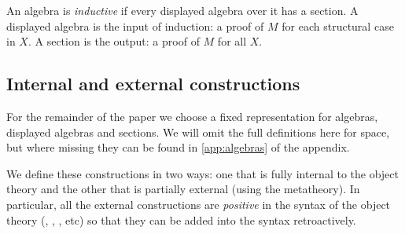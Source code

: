 \begin{definition}
An algebra is \emph{inductive} if every displayed algebra over it has a section.
A displayed algebra is the input of induction: a proof of $M$ for each structural case in $X$.
A section is the output: a proof of $M$ for all $X$.
\end{definition}

\subsection{Internal and external constructions}

For the remainder of the paper we choose a fixed representation for algebras,
displayed algebras and sections. We will omit the full definitions here for
space, but where missing they can be found in \cref{app:algebras} of the appendix.

We define these constructions in two ways: one that is fully internal to the
object theory and the other that is partially external (using the metatheory).
In particular, all the external constructions are \emph{positive} in the
syntax of the object theory (, , , etc) so that
they can be added into the syntax retroactively.

